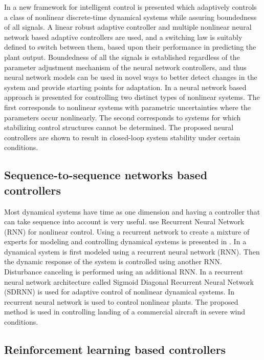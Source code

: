 \documentclass[conference]{IEEEtran}
\begin{document}
In \cite{chen2002ICDC}  a new framework for intelligent control is presented which adaptively controls a class of nonlinear discrete-time dynamical systems while assuring boundedness of all signals. A linear robust adaptive controller and multiple nonlinear neural network based adaptive controllers are used, and a switching law is suitably defined to switch between them, based upon their performance in predicting the plant output. Boundedness of all the signals is established regardless of the parameter adjustment mechanism of the neural network controllers, and thus neural network models can be used in novel ways to better detect changes in the system and provide starting points for adaptation. In \cite{yu1996nips} a neural network based approach is presented for controlling two distinct types of nonlinear systems. The first corresponds to nonlinear systems with parametric uncertainties where the parameters occur nonlinearly. The second corresponds to systems for which stabilizing control structures cannot be determined. The proposed neural controllers are shown to result in closed-loop system stability under certain conditions.

\subsection{\textbf{Sequence-to-sequence networks based controllers}}

Most dynamical systems have time as one dimension and having a controller that can take sequence into account is very useful. \cite{timothy1994nips, plett2003nn, aboueldahab2011identification, lippmann1991nips} use Recurrent Neural Network (RNN) for nonlinear control. Using a recurrent network to create a mixture of experts for modeling and controlling dynamical systems is presented in \cite{timothy1994nips}. In \cite{plett2003nn} a dynamical system is first modeled using a recurrent neural network (RNN). Then the dynamic response of the system is controlled using another RNN. Disturbance canceling is performed using an additional RNN. In \cite{aboueldahab2011identification} a recurrent neural network architecture called Sigmoid Diagonal Recurrent Neural Network (SDRNN) is used for adaptive control of nonlinear dynamical systems. In \cite{lippmann1991nips} recurrent neural network is used to control nonlinear plants. The proposed method is used in controlling landing of a commercial aircraft in severe wind conditions.

\subsection{\textbf{Reinforcement learning based controllers}}
\end{document}
